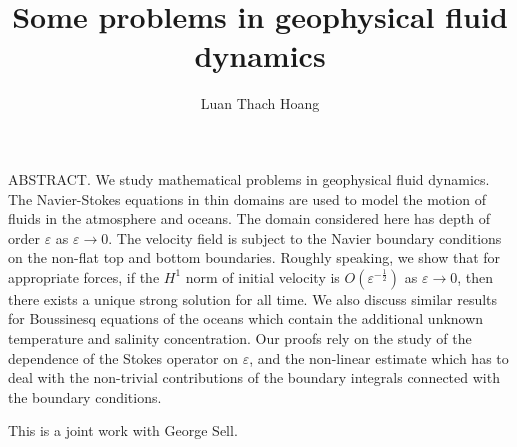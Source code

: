 \documentclass[twoside]{amsart}
\title{Some problems in geophysical fluid dynamics}
\author{Luan Thach Hoang}
\begin{document}


\maketitle

ABSTRACT.
We study mathematical problems in geophysical fluid dynamics.
The Navier-Stokes equations in thin domains are used to model the motion of fluids in the atmosphere and oceans.
The domain considered here has depth of order $\varepsilon$ as $\varepsilon\to 0$. 
The velocity field is subject to the Navier boundary conditions on the non-flat top and bottom boundaries. Roughly speaking, we show that for appropriate forces, if the $H^1$ norm of initial velocity is $O(\varepsilon^{-\frac{1}{2}})$ as $\varepsilon\to 0$, then there exists a unique strong solution for all time.
We also discuss similar results for Boussinesq equations of the oceans which contain the additional unknown temperature and salinity concentration.
Our proofs rely on the study of the dependence of the Stokes operator on $\varepsilon$, 
and the non-linear estimate which has to deal with the non-trivial contributions of the boundary integrals connected with the boundary conditions.


This is a joint work with George Sell.
\end{document}
